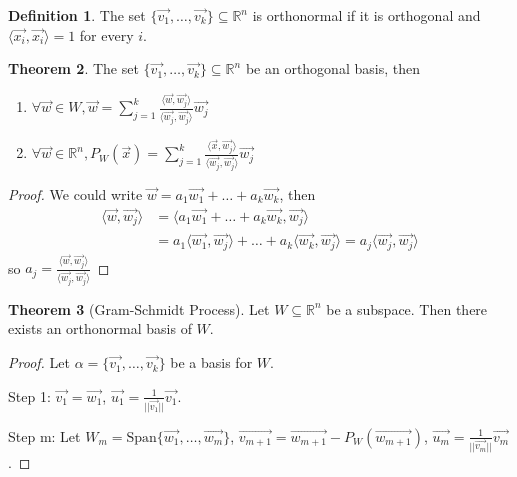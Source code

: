 \documentclass{article}
\theoremstyle{definition}
\newtheorem{theorem}{Theorem}[section]
\newtheorem{definition}[theorem]{Definition}
\theoremstyle{remark}
\begin{document}
\begin{definition}
    The set $\{\vec{v_1},\dots,\vec{v_k}\}\subseteq\mathbb{R}^n$ is orthonormal if it is orthogonal and $\langle \vec{x_i},\vec{x_i}\rangle=1$ for every $i$.
\end{definition}

\begin{theorem}
    The set $\{\vec{v_1},\dots,\vec{v_k}\}\subseteq\mathbb{R}^n$ be an orthogonal basis, then
    \begin{enumerate}
        \item $\forall \vec{w}\in W, \vec{w}=\sum_{j=1}^k\frac{\langle \vec{w},\vec{w_j}\rangle}{\langle \vec{w_j},\vec{w_j}\rangle}\vec{w_j}$
        \item $\forall \vec{w}\in \mathbb{R}^n, P_W(\vec{x})=\sum_{j=1}^k\frac{\langle \vec{x},\vec{w_j}\rangle}{\langle \vec{w_j},\vec{w_j}\rangle}\vec{w_j}$
    \end{enumerate}
\end{theorem}

\begin{proof}
    We could write $\vec{w}=a_1\vec{w_1}+\dots+a_k\vec{w_k}$, then
    \[
    \begin{aligned}
        \langle \vec{w},\vec{w_j}\rangle&=\langle a_1\vec{w_1}+\dots+a_k\vec{w_k},\vec{w_j}\rangle\\
        &=a_1\langle \vec{w_1},\vec{w_j}
    \rangle+\dots+a_k\langle\vec{w_k},\vec{w_j}
    \rangle =a_j\langle \vec{w_j},\vec{w_j}
    \rangle
    \end{aligned}
    \]
    so $a_j=\frac{\langle \vec{w},\vec{w_j}
    \rangle}{\langle \vec{w_j},\vec{w_j}
    \rangle}$
\end{proof}

\begin{theorem}[Gram-Schmidt Process]
    Let $W\subseteq \mathbb{R}^n$ be a subspace.
    Then there exists an orthonormal basis of $W$.
\end{theorem}

\begin{proof}
    Let $\alpha=\{\vec{v_1},\dots,\vec{v_k}\}$ be a basis for $W$.

    Step 1: $\vec{v_1}=\vec{w_1}$, $\vec{u_1}=\frac{1}{||\vec{v_1}||}\vec{v_1}$.

    Step m:
    Let $W_m=\text{Span}\{\vec{w_1},\dots,\vec{w_m}\}$, $\vec{v_{m+1}}=\vec{w_{m+1}}-P_W(\vec{w_{m+1}})$, $\vec{u_m}=\frac{1}{||\vec{v_m}||}\vec{v_m}$.
\end{proof}
\end{document}
